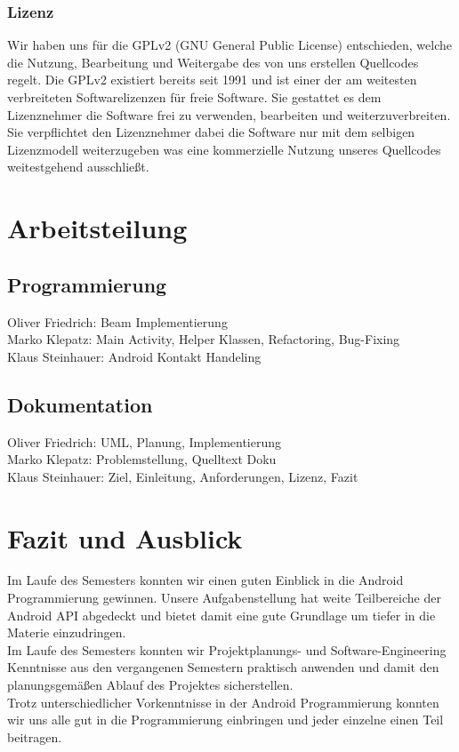 \documentclass[a4paper,ngerman,12pt]{scrreprt}
\newcommand{\+}{\discretionary{\mbox{\scriptsize$\hookleftarrow$}}{}{}}
\begin{document}
\subsection*{Lizenz}

Wir haben uns für die G\+P\+Lv2 (G\+NU General Public License) entschieden, welche die Nutzung, Bearbeitung und Weitergabe des von uns erstellen Quellcodes regelt. Die G\+P\+Lv2 existiert bereits seit 1991 und ist einer der am weitesten verbreiteten Softwarelizenzen für freie Software. Sie gestattet es dem Lizenznehmer die Software frei zu verwenden, bearbeiten und weiterzuverbreiten. Sie verpflichtet den Lizenznehmer dabei die Software nur mit dem selbigen Lizenzmodell weiterzugeben was eine kommerzielle Nutzung unseres Quellcodes weitestgehend ausschließt. 

\chapter{Arbeitsteilung}
\section*{Programmierung}

Oliver Friedrich\+: Beam Implementierung \\ 
Marko Klepatz\+: Main Activity, Helper Klassen, Refactoring, Bug-\/\+Fixing\\
Klaus Steinhauer\+: Android Kontakt Handeling\\ 

\section*{Dokumentation}

Oliver Friedrich\+: U\+ML, Planung, Implementierung\\
Marko Klepatz\+: Problemstellung, Quelltext Doku\\
Klaus Steinhauer\+: Ziel, Einleitung, Anforderungen, Lizenz, Fazit\\

\chapter{Fazit und Ausblick}

Im Laufe des Semesters konnten wir einen guten Einblick in die Android Programmierung gewinnen. Unsere Aufgabenstellung hat weite Teilbereiche der Android A\+PI abgedeckt und bietet damit eine gute Grundlage um tiefer in die Materie einzudringen. \\
Im Laufe des Semesters konnten wir Projektplanungs-\/ und Software-\/\+Engineering Kenntnisse aus den vergangenen Semestern praktisch anwenden und damit den planungsgemäßen Ablauf des Projektes sicherstellen.\\ 
Trotz unterschiedlicher Vorkenntnisse in der Android Programmierung konnten wir uns alle gut in die Programmierung einbringen und jeder einzelne einen Teil beitragen.
\end{document}
